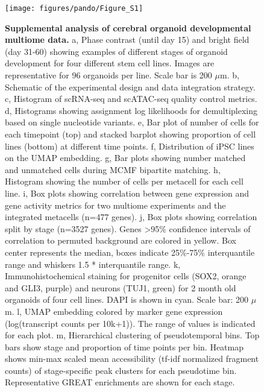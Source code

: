 \begin{figure}[h!]
    \centering
	\texttt{[image: figures/pando/Figure\_S1]}
    \label{fig:regS1}
\end{figure}

\clearpage

\begin{figure}[t!]
    \centering
    \caption{\textbf{Supplemental analysis of cerebral organoid developmental multiome data.} a, Phase contrast (until day 15) and bright field (day 31-60) showing examples of different stages of organoid development for four different stem cell lines. Images are representative for 96 organoids per line. Scale bar is 200 $\mu$m. b, Schematic of the experimental design and data integration strategy. c, Histogram of scRNA-seq and scATAC-seq quality control metrics. d, Histograms showing assignment log likelihoods for demultiplexing based on single nucleotide variants. e, Bar plot of number of cells for each timepoint (top) and stacked barplot showing proportion of cell lines (bottom) at different time points. f, Distribution of iPSC lines on the UMAP embedding. g, Bar plots showing number matched and unmatched cells during MCMF bipartite matching. h, Histogram showing the number of cells per metacell for each cell line. i, Box plots showing correlation between gene expression and gene activity metrics for two multiome experiments and the integrated metacells (n=477 genes). j, Box plots showing correlation split by stage (n=3527 genes). Genes >95\% confidence intervals of correlation to permuted background are colored in yellow. Box center represents the median, boxes indicate 25\%-75\% interquantile range and whiskers 1.5 * interquantile range. k, Immunohistochemical staining for progenitor cells (SOX2, orange and GLI3, purple) and neurons (TUJ1, green) for 2 month old organoids of four cell lines. DAPI is shown in cyan. Scale bar: 200 $\mu$m. l, UMAP embedding colored by marker gene expression (log(transcript counts per 10k+1)). The range of values is indicated for each plot. m, Hierarchical clustering of pseudotemporal bins. Top bars show stage and proportion of time points per bin. Heatmap shows min-max scaled mean accessibility (tf-idf normalized fragment counts) of stage-specific peak clusters for each pseudotime bin. Representative GREAT enrichments are shown for each stage.}
\end{figure}


